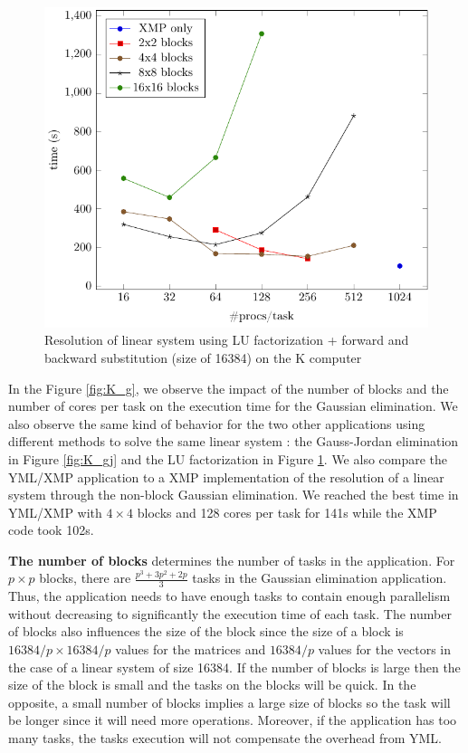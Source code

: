 \begin{figure}[h]
	\caption{Resolution of linear system using LU factorization + forward and backward substitution (size of 16384) on the K computer\label{fig:K_lu}}
	\centering
	\includegraphics[width=.6\textwidth]{figK-lu-16k.pdf}
\end{figure}

In the Figure \ref{fig:K_g}, we observe the impact of the number of blocks and the number of cores per task on the execution time for the Gaussian elimination.
We also observe the same kind of behavior for the two other applications using different methods to solve the same linear system : the Gauss-Jordan elimination in Figure \ref{fig:K_gj} and the LU factorization in Figure \ref{fig:K_lu}.
We also compare the YML/XMP application to a XMP implementation of the resolution of a linear system through the non-block Gaussian elimination.
We reached the best time in YML/XMP with $4 \times 4$ blocks and 128 cores per task for 141s while the XMP code took 102s.

\textbf{The number of blocks} determines the number of tasks in the application.
For $p \times p$ blocks, there are $\frac{p^3+3p^2+2p}{3}$ tasks in the Gaussian elimination application.
Thus, the application needs to have enough tasks to contain enough parallelism without decreasing to significantly the execution time of each task.
The number of blocks also influences the size of the block since the size of a block is $16384/p \times 16384/p$ values for the matrices and $16384/p$ values for the vectors in the case of a linear system of size 16384.
If the number of blocks is large then the size of the block is small and the tasks on the blocks will be quick.
In the opposite, a small number of blocks implies a large size of blocks so the task will be longer since it will need more operations.
Moreover, if the application has too many tasks, the tasks execution will not compensate the overhead from YML.


